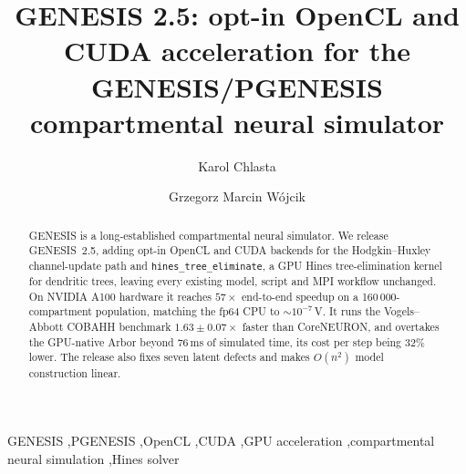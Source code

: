 \documentclass[preprint,12pt, a4paper]{elsarticle}
\newcommand{\hte}{\texttt{hines\_\allowbreak tree\_\allowbreak eliminate}}
\begin{document}
\renewcommand{\labelenumii}{\arabic{enumi}.\arabic{enumii}}

\begin{frontmatter}



\title{GENESIS 2.5: opt-in OpenCL and CUDA acceleration for the GENESIS/PGENESIS compartmental neural simulator}

\author[1]{Karol Chlasta}
\author[2]{Grzegorz Marcin W\'ojcik}

\address[1]{Kozminski University, ul. Jagiello\'nska 57/59, 03-301 Warsaw, Poland; WarsawIQ, Al. Jana Paw\l{}a II 43A/37B, 01-001 Warsaw, Poland}
\address[2]{Maria Curie-Sk{\l}odowska University, ul. Akademicka 9, 20-033 Lublin, Poland}


\begin{abstract}
GENESIS is a long-established compartmental neural simulator. We release GENESIS~2.5, adding opt-in OpenCL and CUDA backends for the Hodgkin--Huxley channel-update path and \hte{}, a GPU Hines tree-elimination kernel for dendritic trees, leaving every existing model, script and MPI workflow unchanged. On NVIDIA A100 hardware it reaches $57\times$ end-to-end speedup on a 160\,000-compartment population, matching the fp64 CPU to $\sim$$10^{-7}$\,V. It runs the Vogels--Abbott COBAHH benchmark $1.63\pm0.07\times$ faster than CoreNEURON, and overtakes the GPU-native Arbor beyond 76\,ms of simulated time, its cost per step being 32\% lower. The release also fixes seven latent defects and makes $O(n^2)$ model construction linear.
\end{abstract}

\begin{keyword}
GENESIS \sep PGENESIS \sep OpenCL \sep CUDA \sep GPU acceleration \sep compartmental neural simulation \sep Hines solver
\end{keyword}

\end{frontmatter}
\end{document}
